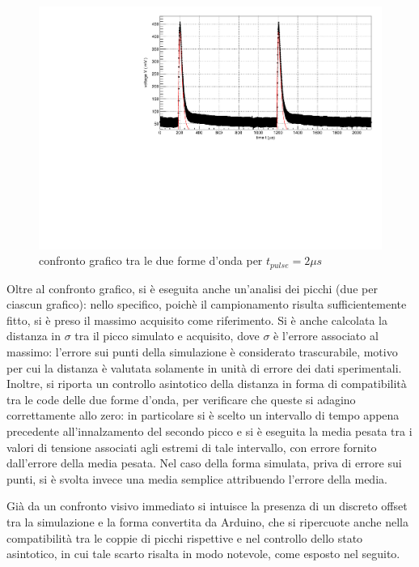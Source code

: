 \documentclass{article}
\begin{document}
\begin{center}
\begin{figure}[H]
\centering
\includegraphics[scale=0.4, angle=0]{arduino2.pdf}
\caption{confronto grafico tra le due forme d'onda per $t_{pulse}=2 \mu s$}
\label{fig:arduino2}
\end{figure}
\end{center}


Oltre al confronto grafico, si è eseguita anche un'analisi dei picchi (due per ciascun grafico): nello specifico, poichè il campionamento risulta sufficientemente fitto, si è preso il massimo
acquisito come riferimento. Si è anche calcolata la distanza in 
$\sigma$ tra il picco simulato e acquisito, dove $\sigma$ è l'errore associato al massimo: l'errore sui punti della simulazione
è considerato trascurabile, motivo per cui la distanza è valutata solamente in unità di errore dei dati sperimentali.
Inoltre, si riporta un controllo asintotico della distanza in forma di compatibilità tra le code delle due forme d'onda, per verificare che queste 
si adagino correttamente allo zero: in particolare si è scelto un intervallo di tempo appena precedente all'innalzamento del secondo picco e si è eseguita la media
pesata tra i valori di tensione associati agli estremi di tale intervallo, con errore fornito dall'errore della media pesata. Nel caso della forma simulata, priva di 
errore sui punti, si è svolta invece una media semplice attribuendo l'errore della media.

Già da un confronto visivo immediato si intuisce la presenza di un discreto offset tra la simulazione e la forma convertita da Arduino, che si ripercuote
anche nella compatibilità tra le coppie di picchi rispettive e nel controllo dello stato asintotico, in cui tale scarto risalta in modo notevole, come esposto
nel seguito.
\end{document}
